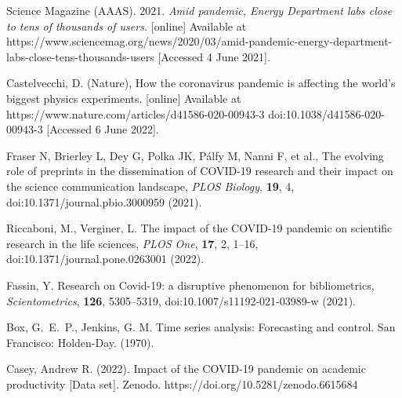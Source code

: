 \documentclass[]{rsos}%
\begin{document}
\begin{thebibliography}{10}
Science Magazine (AAAS). 2021. \emph{Amid pandemic, Energy Department labs close to tens of thousands of users.} [online] Available at {https://www.sciencemag.org/news/2020/03/amid-pandemic-energy-department-labs-close-tens-thousands-users} [Accessed 4 June 2021].

Castelvecchi, D. (Nature), {How the coronavirus pandemic is affecting the world's biggest physics experiments.} [online] Available at {https://www.nature.com/articles/d41586-020-00943-3} doi:10.1038/d41586-020-00943-3 [Accessed 6 June 2022].

Fraser N, Brierley L, Dey G, Polka JK, Pálfy M, Nanni F, et al., {The evolving role of preprints in the dissemination of COVID-19 research and their impact on the science communication landscape}, \emph{PLOS Biology}, \textbf{19}, 4, doi:10.1371/journal.pbio.3000959 \newblock (2021).

Riccaboni, M., Verginer, L. {The impact of the COVID-19 pandemic on scientific research in the life sciences}, \emph{PLOS One}, \textbf{17}, 2, 1--16, doi:10.1371/journal.pone.0263001 \newblock (2022).

{Fassin, Y.} {Research on Covid-19: a disruptive phenomenon for bibliometrics}, \emph{Scientometrics}, \textbf{126}, 5305--5319, doi:10.1007/s11192-021-03989-w \newblock (2021).

{Box, G.~E.~P., Jenkins, G. M.} Time series analysis: Forecasting and control. San Francisco: Holden-Day. \newblock (1970).

 Casey, Andrew R. (2022). Impact of the COVID-19 pandemic on academic productivity [Data set]. Zenodo. https://doi.org/10.5281/zenodo.6615684

\end{thebibliography}
\end{document}

